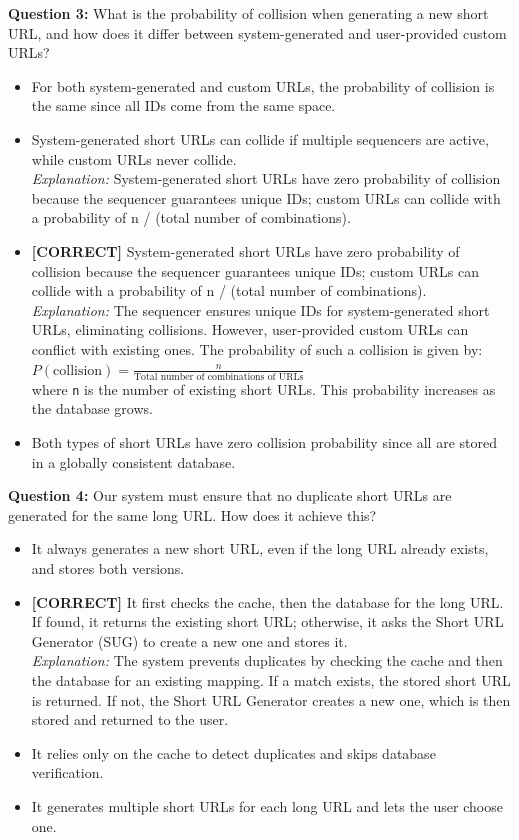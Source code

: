 \vspace{0.3cm}
\noindent
\textbf{Question 3:} What is the probability of collision when generating a new short URL, and how does it differ between system-generated and user-provided custom URLs?
\\[0.2cm]
\begin{itemize}
 \item For both system-generated and custom URLs, the probability of collision is the same since all IDs come from the same space.
 \item System-generated short URLs can collide if multiple sequencers are active, while custom URLs never collide.
\\[0.1cm]
\textit{Explanation:} 
System-generated short URLs have zero probability of collision because the sequencer guarantees unique IDs; custom URLs can collide with a probability of n / (total number of combinations).
 \item \textbf{[CORRECT]} System-generated short URLs have zero probability of collision because the sequencer guarantees unique IDs; custom URLs can collide with a probability of n / (total number of combinations).
\\[0.1cm]
\textit{Explanation:} 
The sequencer ensures unique IDs for system-generated short URLs, eliminating collisions. However, user-provided custom URLs can conflict with existing ones. The probability of such a collision is given by:
\\
{{\(P(\text{collision}) = \frac{n}{\text{Total number of combinations of URLs}}\)}}
\\
where \texttt{n} is the number of existing short URLs. This probability increases as the database grows.
 \item Both types of short URLs have zero collision probability since all are stored in a globally consistent database.
\end{itemize}
\vspace{0.3cm}
\noindent
\textbf{Question 4:} Our system must ensure that no duplicate short URLs are generated for the same long URL. How does it achieve this?
\\[0.2cm]
\begin{itemize}
 \item It always generates a new short URL, even if the long URL already exists, and stores both versions.
 \item \textbf{[CORRECT]} It first checks the cache, then the database for the long URL. If found, it returns the existing short URL; otherwise, it asks the Short URL Generator (SUG) to create a new one and stores it.
\\[0.1cm]
\textit{Explanation:} 
The system prevents duplicates by checking the cache and then the database for an existing mapping. If a match exists, the stored short URL is returned. If not, the Short URL Generator creates a new one, which is then stored and returned to the user.
 \item It relies only on the cache to detect duplicates and skips database verification.
 \item It generates multiple short URLs for each long URL and lets the user choose one.
\end{itemize}
